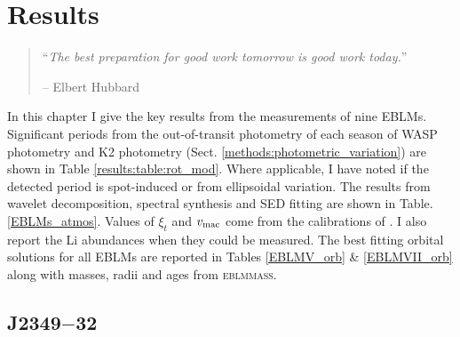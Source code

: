 \chapter{Results}\label{chapter:results}

\begin{quote}
``{\it The best preparation for good work tomorrow is good work today.}''

-- Elbert Hubbard
\end{quote}








In this chapter I give the key results from the measurements of nine EBLMs. Significant periods from the out-of-transit photometry of each season of WASP photometry and K2 photometry (Sect. \ref{methods:photometric_variation}) are shown in Table \ref{results:table:rot_mod}. Where applicable, I have noted if the detected period is spot-induced or from ellipsoidal variation. The results from wavelet decomposition, spectral synthesis and SED fitting are shown in Table. \ref{EBLMs_atmos}. Values of $\xi_t$ and $v_{\rm mac}$ come from the calibrations of \citet{Doyle2015}. I also report the Li abundances when they could be measured. The best fitting orbital solutions for all EBLMs are reported in Tables \ref{EBLMV_orb} \& \ref{EBLMVII_orb} along with masses, radii and ages from \textsc{eblmmass}. 





\section{J2349$-$32}

